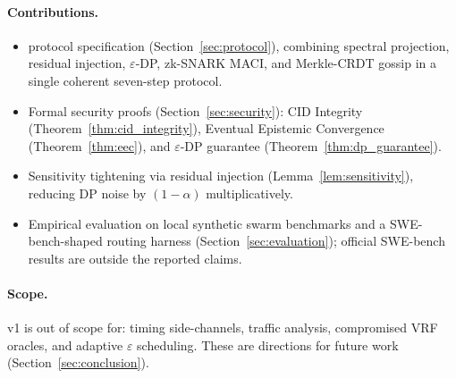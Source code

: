 \paragraph{Contributions.}
\begin{itemize}
  \item \fedsink{} protocol specification
    (Section~\ref{sec:protocol}), combining spectral projection, residual injection,
    $\varepsilon$-DP, zk-SNARK MACI, and Merkle-CRDT gossip in a single coherent
    seven-step protocol.

  \item Formal security proofs (Section~\ref{sec:security}): CID Integrity
    (Theorem~\ref{thm:cid_integrity}), Eventual Epistemic Convergence
    (Theorem~\ref{thm:eec}), and $\varepsilon$-DP guarantee
    (Theorem~\ref{thm:dp_guarantee}).

  \item Sensitivity tightening via residual injection (Lemma~\ref{lem:sensitivity}),
    reducing DP noise by $(1-\alpha)$ multiplicatively.

  \item Empirical evaluation on local synthetic swarm benchmarks and a
    SWE-bench-shaped routing harness (Section~\ref{sec:evaluation}); official
    SWE-bench results are outside the reported claims.
\end{itemize}

\paragraph{Scope.}
\fedsink{} v1 is out of scope for: timing side-channels, traffic analysis, compromised
VRF oracles, and adaptive $\varepsilon$ scheduling.  These are directions for future
work (Section~\ref{sec:conclusion}).
